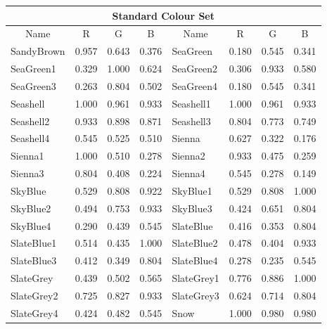 {\begin{center}
\begin{tabular}{|l|l|l|l|l|l|l|l|}
\hline
\multicolumn{8}{|c|}{{\large Standard Colour Set}} \\ \hline
\multicolumn{1}{|c|}{Name} & \multicolumn{1}{|c|}{R} & \multicolumn{1}{c|}{G} &
\multicolumn{1}{c|}{B} & \multicolumn{1}{|c|}{Name} & \multicolumn{1}{c|}{R} &
\multicolumn{1}{c|}{G} & \multicolumn{1}{c|}{B}  \\ \hline
SandyBrown          & 0.957 & 0.643 & 0.376 & SeaGreen            & 0.180 & 0.545 & 0.341 \\ 
SeaGreen1           & 0.329 & 1.000 & 0.624 & SeaGreen2           & 0.306 & 0.933 & 0.580 \\ 
SeaGreen3           & 0.263 & 0.804 & 0.502 & SeaGreen4           & 0.180 & 0.545 & 0.341 \\ 
Seashell            & 1.000 & 0.961 & 0.933 & Seashell1           & 1.000 & 0.961 & 0.933 \\ 
Seashell2           & 0.933 & 0.898 & 0.871 & Seashell3           & 0.804 & 0.773 & 0.749 \\ 
Seashell4           & 0.545 & 0.525 & 0.510 & Sienna              & 0.627 & 0.322 & 0.176 \\ 
Sienna1             & 1.000 & 0.510 & 0.278 & Sienna2             & 0.933 & 0.475 & 0.259 \\ 
Sienna3             & 0.804 & 0.408 & 0.224 & Sienna4             & 0.545 & 0.278 & 0.149 \\ 
SkyBlue             & 0.529 & 0.808 & 0.922 & SkyBlue1            & 0.529 & 0.808 & 1.000 \\ 
SkyBlue2            & 0.494 & 0.753 & 0.933 & SkyBlue3            & 0.424 & 0.651 & 0.804 \\ 
SkyBlue4            & 0.290 & 0.439 & 0.545 & SlateBlue           & 0.416 & 0.353 & 0.804 \\ 
SlateBlue1          & 0.514 & 0.435 & 1.000 & SlateBlue2          & 0.478 & 0.404 & 0.933 \\ 
SlateBlue3          & 0.412 & 0.349 & 0.804 & SlateBlue4          & 0.278 & 0.235 & 0.545 \\ 
SlateGrey           & 0.439 & 0.502 & 0.565 & SlateGrey1          & 0.776 & 0.886 & 1.000 \\ 
SlateGrey2          & 0.725 & 0.827 & 0.933 & SlateGrey3          & 0.624 & 0.714 & 0.804 \\ 
SlateGrey4          & 0.424 & 0.482 & 0.545 & Snow                & 1.000 & 0.980 & 0.980 \\ 

\end{tabular}
\end{center}}

